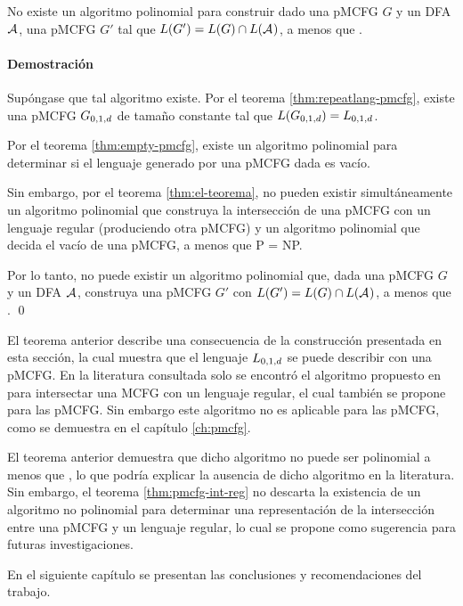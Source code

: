 \begin{theorem}
    \label{thm:pmcfg-int-reg}
    No existe un algoritmo polinomial para construir dado una pMCFG $G$ y un DFA $\mathcal{A}_{}$, una pMCFG $G'$ tal que $L(G')=L(G) \cap L(\mathcal{A}_{})$, a menos que \pnp.
\end{theorem}

\paragraph{Demostración}
Supóngase que tal algoritmo existe. Por el teorema \ref{thm:repeatlang-pmcfg}, existe una pMCFG $G_{0, 1, d}$ de tamaño constante tal que $L(G_{0, 1, d}) = L_{0,1,d}$.

Por el teorema \ref{thm:empty-pmcfg}, existe un algoritmo polinomial para determinar si el lenguaje generado por una pMCFG dada es vacío.

Sin embargo, por el teorema \ref{thm:el-teorema}, no pueden existir simultáneamente un algoritmo polinomial que construya la intersección de una pMCFG con un lenguaje regular (produciendo otra pMCFG) y un algoritmo polinomial que decida el vacío de una pMCFG, a menos que P = NP.

Por lo tanto, no puede existir un algoritmo polinomial que, dada una pMCFG $G$ y un DFA $\mathcal{A}_{}$, construya una pMCFG $G'$ con $L(G') = L(G) \cap L(\mathcal{A}_{})$, a menos que \pnp. \qed

El teorema anterior describe una consecuencia de la construcción presentada en esta sección, la cual muestra que el lenguaje $L_{0,1,d}$ se puede describir con una pMCFG. En la literatura consultada solo se encontró el algoritmo propuesto en \cite{Seki1991OnMC} para intersectar una MCFG con un lenguaje regular, el cual también se propone para las pMCFG. Sin embargo este algoritmo no es aplicable para las pMCFG, como se demuestra en el capítulo \ref{ch:pmcfg}.

El teorema anterior demuestra que dicho algoritmo no puede ser polinomial a menos que \pnp, lo que podría explicar la ausencia de dicho algoritmo en la literatura. Sin embargo, el teorema \ref{thm:pmcfg-int-reg} no descarta la existencia de un algoritmo no polinomial para determinar una representación de la intersección entre una pMCFG y un lenguaje regular, lo cual se propone como sugerencia para futuras investigaciones.

En el siguiente capítulo se presentan las conclusiones y recomendaciones del trabajo.